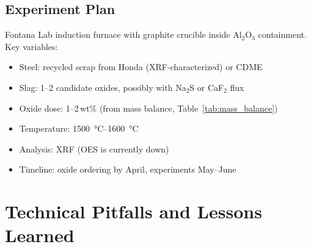 \documentclass[11pt]{article}
\begin{document}
\subsection{Experiment Plan}

Fontana Lab induction furnace with graphite crucible inside Al$_2$O$_3$ containment. Key variables:
\begin{itemize}[leftmargin=*]
    \item Steel: recycled scrap from Honda (XRF-characterized) or CDME
    \item Slag: 1--2 candidate oxides, possibly with Na$_2$S or CaF$_2$ flux
    \item Oxide dose: 1--2\,wt\% (from mass balance, Table~\ref{tab:mass_balance})
    \item Temperature: \SI{1500}{\celsius}--\SI{1600}{\celsius}
    \item Analysis: XRF (OES is currently down)
    \item Timeline: oxide ordering by April, experiments May--June
\end{itemize}


\section{Technical Pitfalls and Lessons Learned}
\end{document}
